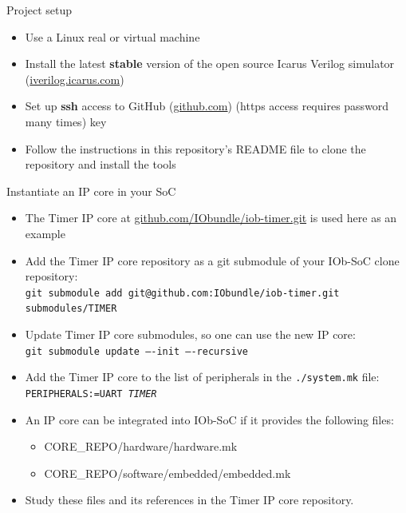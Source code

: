 \documentclass [xcolor=svgnames, t] {beamer}
\begin{document}
\begin{frame}{Project setup}
\begin{center}
  \begin{itemize}
    \item Use a Linux real or virtual machine
    \item Install the latest {\bf stable} version of the open source Icarus Verilog simulator (\url{iverilog.icarus.com})
    \item Set up {\bf ssh} access to GitHub (\url{github.com}) (https access requires password many times)
      key
    \item Follow the instructions in this repository's README file to clone the repository and install the tools
  \end{itemize}
\end{center}
\end{frame}


\begin{frame}{Instantiate an IP core in your SoC}
  \begin{itemize}
  \item The Timer IP core at \url{github.com/IObundle/iob-timer.git} is used here as an example
  \item Add the Timer IP core repository as a git submodule of your IOb-SoC clone repository:\\
    {\tt \tiny git submodule add git@github.com:IObundle/iob-timer.git submodules/TIMER}
  \item Update Timer IP core submodules, so one can use the new IP core:\\
    {\tt \tiny git submodule update ----init ----recursive}
  \item Add the Timer IP core to the list of peripherals in the {\tt ./system.mk} file:\\
    {\tt PERIPHERALS:=UART {\em TIMER}}
  \item An IP core can be integrated into IOb-SoC if it provides the following files: 
    \begin{itemize}
    \item CORE\_REPO/hardware/hardware.mk
    \item CORE\_REPO/software/embedded/embedded.mk
    \end{itemize}
  \item Study these files and its references in the Timer IP core repository.
  \end{itemize}
\end{frame}
\end{document}
